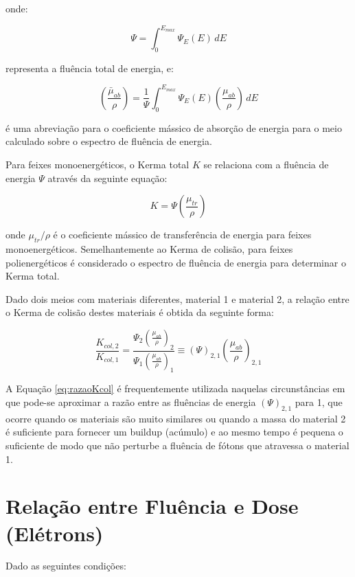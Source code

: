 \documentclass[11pt,a4paper]{article}
\begin{document}
		\noindent onde:

			$$\Psi = \int_{0}^{E_{max}} \Psi_E(E) \, dE$$

		\noindent representa a fluência total de energia, e:

			$$\left(\frac{\bar{\mu}_{ab}}{\rho}\right)
			= \frac{1}{\Psi} \int_{0}^{E_{max}} \Psi_E(E) \left(\frac{\mu_{ab}}{\rho}\right)  \,dE
			$$

		\noindent é uma abreviação para o coeficiente mássico de absorção de energia para o meio calculado sobre o espectro de fluência de energia.


		Para feixes monoenergéticos, o Kerma total $K$ se relaciona com a fluência de energia $\Psi$ através da seguinte equação:

		\begin{equation}
			K = \Psi \left(\frac{\mu_{tr}}{\rho}\right)
		\end{equation}

		\noindent onde $\mu_{tr}/\rho$ é o coeficiente mássico de transferência de energia para feixes monoenergéticos. Semelhantemente ao Kerma de colisão, para feixes polienergéticos é considerado o espectro de fluência de energia para determinar o Kerma total.


		Dado dois meios com materiais diferentes, material 1 e material 2, a relação entre o Kerma de colisão destes materiais é obtida da seguinte forma:

		\begin{equation}
			\frac{K_{col,2}}{K_{col, 1}} = \frac{\Psi_2 \left(\frac{\mu_{ab}}{\rho}\right)_2}{\Psi_1 \left(\frac{\mu_{ab}}{\rho}\right)_1}
			\equiv \left(\Psi \right)_{2,1}\left(\frac{\mu_{ab}}{\rho}\right)_{2,1}
			\label{eq:razaoKcol}
		\end{equation}

		A Equação \ref{eq:razaoKcol} é frequentemente utilizada naquelas circunstâncias em que pode-se aproximar a razão entre as fluências de energia $(\Psi)_{2,1}$ para 1, que ocorre quando os materiais são muito similares ou quando a massa do material 2 é suficiente para fornecer um buildup (acúmulo) e ao mesmo tempo é pequena o suficiente de modo que não perturbe a fluência de fótons que atravessa o material 1.


	\section{Relação entre Fluência e Dose (Elétrons)}

		Dado as seguintes condições:
\end{document}
